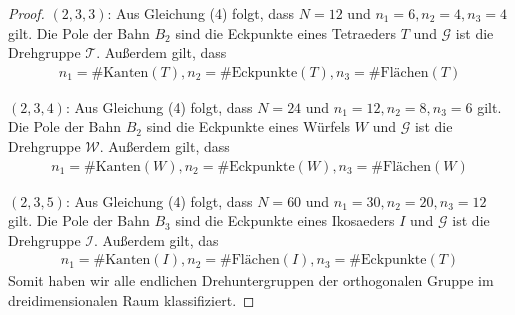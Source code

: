 \begin{proof}
	$(2,3,3)$: Aus Gleichung (4) folgt, dass $N = 12$ und $n_1 = 6, n_2 = 4, n_3 = 4$ gilt. Die Pole der Bahn $B_2$ sind die Eckpunkte eines Tetraeders $T$ und $\mathcal{G}$ ist die Drehgruppe $\mathcal{T}$. Außerdem gilt, dass
	\begin{align*}
        n_1 = \# \text{Kanten}(T),n_2 = \# \text{Eckpunkte}(T),n_3 = \# \text{Flächen}(T)
	\end{align*}


	$(2,3,4)$: Aus Gleichung (4) folgt, dass $N = 24$ und $n_1 = 12, n_2 = 8, n_3 = 6$ gilt. Die Pole der Bahn $B_2$ sind die Eckpunkte eines Würfels $W$ und $\mathcal{G}$ ist die Drehgruppe $\mathcal{W}$. Außerdem gilt, dass
	\begin{align*}
        n_1 = \# \text{Kanten}(W),n_2 = \# \text{Eckpunkte}(W),n_3 = \# \text{Flächen}(W)
	\end{align*}


	$(2,3,5)$: Aus Gleichung (4) folgt, dass $N = 60$ und $n_1 = 30, n_2 = 20, n_3= 12$ gilt. Die Pole der Bahn $B_3$ sind die Eckpunkte eines Ikosaeders $I$ und $\mathcal{G}$ ist die Drehgruppe $\mathcal{I}$. Außerdem gilt, das
	\begin{align*}
        n_1 = \# \text{Kanten}(I),n_2 = \# \text{Flächen}(I),n_3 = \# \text{Eckpunkte}(T)
	\end{align*}
Somit haben wir alle endlichen Drehuntergruppen der orthogonalen Gruppe im dreidimensionalen Raum klassifiziert.
\end{proof}
